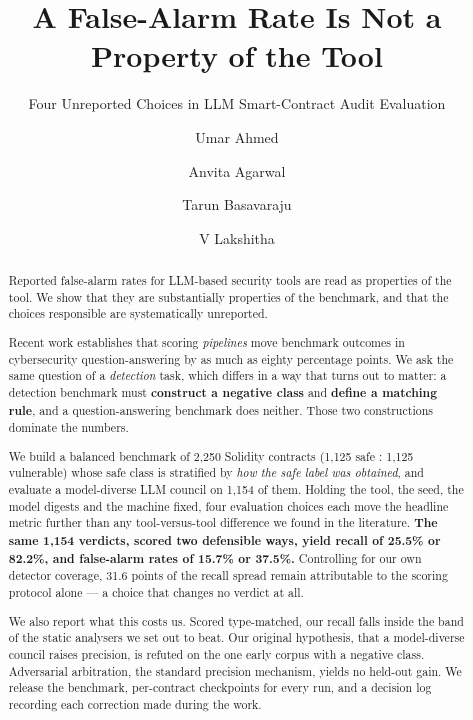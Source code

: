 \documentclass[sigconf,nonacm]{acmart}
\begin{document}
\title{A False-Alarm Rate Is Not a Property of the Tool}
\subtitle{Four Unreported Choices in LLM Smart-Contract Audit Evaluation}

\author{Umar Ahmed}

\author{Anvita Agarwal}

\author{Tarun Basavaraju}

\author{V Lakshitha}

\begin{abstract}
Reported false-alarm rates for LLM-based security tools are read as properties of
the tool. We show that they are substantially properties of the benchmark, and
that the choices responsible are systematically unreported.

Recent work establishes that scoring \emph{pipelines} move benchmark outcomes in
cybersecurity question-answering by as much as eighty percentage points. We ask
the same question of a \emph{detection} task, which differs in a way that turns
out to matter: a detection benchmark must \textbf{construct a negative class} and
\textbf{define a matching rule}, and a question-answering benchmark does neither.
Those two constructions dominate the numbers.

We build a balanced benchmark of 2,250 Solidity contracts (1,125 safe :
1,125 vulnerable) whose safe class is stratified by \emph{how the safe label was
obtained}, and evaluate a model-diverse LLM council on 1,154 of them. Holding the
tool, the seed, the model digests and the machine fixed, four evaluation choices
each move the headline metric further than any tool-versus-tool difference we
found in the literature. \textbf{The same 1,154 verdicts, scored two defensible
ways, yield recall of 25.5\% or 82.2\%, and false-alarm rates of 15.7\% or
37.5\%.} Controlling for our own detector coverage, 31.6 points of the recall
spread remain attributable to the scoring protocol alone --- a choice that
changes no verdict at all.

We also report what this costs us. Scored type-matched, our recall falls inside
the band of the static analysers we set out to beat. Our original hypothesis,
that a model-diverse council raises precision, is refuted on the one early corpus
with a negative class. Adversarial arbitration, the standard precision mechanism,
yields no held-out gain. We release the benchmark, per-contract checkpoints for
every run, and a decision log recording each correction made during the work.
\end{abstract}
\end{document}
